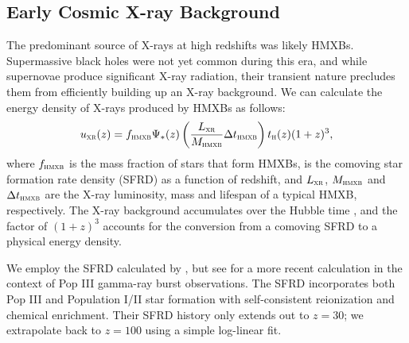 \documentclass[../thesis.tex]{subfiles}
\begin{document}
\subsection{Early Cosmic X-ray Background}
\label{HMXB}
The predominant source of X-rays at high redshifts was likely HMXBs.
Supermassive black holes were not yet common during this era, and
while supernovae produce significant X-ray radiation, their transient
nature precludes them from efficiently building up an X-ray
background. We can calculate the energy density \uxr
of X-rays produced by HMXBs as follows:
\begin{equation}
  {u}_{\textsc{xr}}(z) = f_{\textsc{hmxb}} \Psi_{*}(z) \left(\frac{L_{\textsc{xr}}}{M_{\textsc{hmxb}}}\Delta t_{\textsc{hmxb}}\right) 
  {t}_{\textsc{h}}(z) (1+z)^3,
\end{equation}
where $f_{\textsc{hmxb}}$ is the mass fraction of stars that form HMXBs, \sfrz
is the comoving star formation rate density (SFRD) as a function of
redshift, and $L_{\textsc{xr}}$, $M_{\textsc{hmxb}}$ and $\Delta t_{\textsc{hmxb}}$ are the
X-ray luminosity, mass and lifespan of a typical HMXB, respectively.  The
X-ray background accumulates over the Hubble time \tH, and the factor
of $(1+z)^3$ accounts for the conversion from a comoving SFRD to a
physical energy density. 

We employ the SFRD calculated by \citet{GreifBromm2006}, but see \citet{Campisietal2011} for a more recent calculation in the context of Pop III gamma-ray burst observations. The \citet{GreifBromm2006} SFRD incorporates both Pop III and Population I/II star formation with self-consistent reionization and chemical enrichment.  Their SFRD history only extends out to $z=30$; we
extrapolate back to $z=100$ using a simple log-linear fit. 
\end{document}
